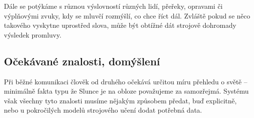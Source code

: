 Dále se potýkáme s různou výslovností různých lidí, přeřeky, opravami
či výplňovými zvuky, kdy se mluvčí rozmýšlí, co chce říct dál. Zvláště
pokud se něco takového vyskytne uprostřed slova, může být obtížné dát
strojově dohromady výsledek promluvy.

\subsection{Očekávané znalosti, domýšlení}

Při běžné komunikaci člověk od druhého očekává určitou míru přehledu o světě
-- minimálně fakta typu že Slunce je na obloze považujeme za samozřejmá.
Systému však všechny tyto znalosti musíme nějakým způsobem předat, buď
explicitně, nebo u pokročilých modelů strojového učení dodat potřebná
data.